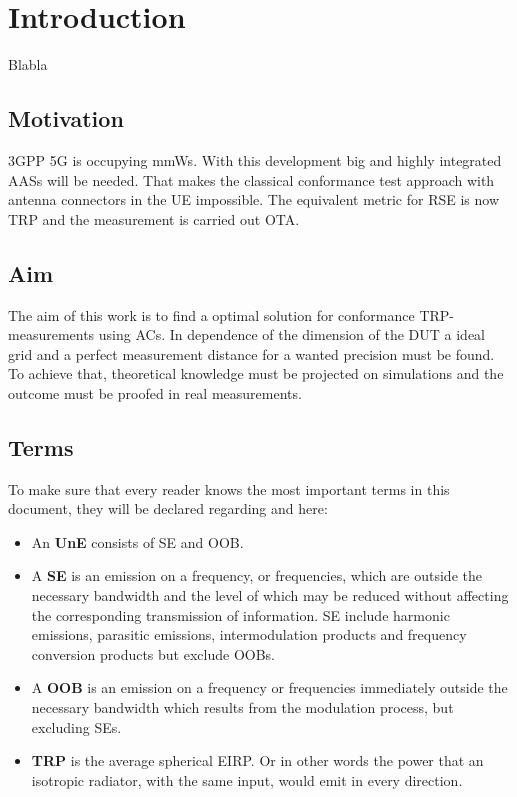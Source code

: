 \chapter{Introduction}

Blabla \cite{2018arXiv180310993F} \cite{keysightota} \cite{inproceedings} \cite{6375745} \cite{balanis} \cite{19510} \cite{1446714} \\

\section{Motivation}

\ac{3GPP} \ac{5G} is occupying \acp{mmW}. With this development big and highly integrated  \acp{AAS} will be needed. That makes the classical conformance test approach with antenna connectors in the \ac{UE} impossible. The equivalent metric for \ac{RSE} is now \ac{TRP} and the measurement is carried out \ac{OTA}.

\section{Aim}

The aim of this work is to find a optimal solution for conformance  \ac{TRP}-measurements using \acp{AC}. In dependence of the dimension of the \ac{DUT} a ideal grid and a perfect measurement distance for a wanted precision must be found. To achieve that, theoretical knowledge must be projected on simulations and the outcome must be proofed in real measurements.

\section{Terms}

To make sure that every reader knows the most important terms in this document, they will be declared regarding \cite{seitur} and \cite{ctiaat} here:

\begin{itemize}
\item An \textbf{\acf{UnE}} consists of \acl{SE} and \acl{OOB}.
\item A \textbf{\acf{SE}} is an emission on a frequency, or frequencies, which are outside the necessary bandwidth and the level of which may be reduced without affecting the corresponding transmission of information. \acl{SE} include harmonic
emissions, parasitic emissions, intermodulation products and frequency conversion products but exclude \aclp{OOB}.
\item A \textbf{\acf{OOB}} is an emission on a frequency or frequencies immediately outside the necessary bandwidth which results from the modulation process, but excluding \aclp{SE}.
\item \textbf{\acf{TRP}} is the average spherical \ac{EIRP}. Or in other words the power that an isotropic radiator, with the same input, would emit in every direction.
\end{itemize}

